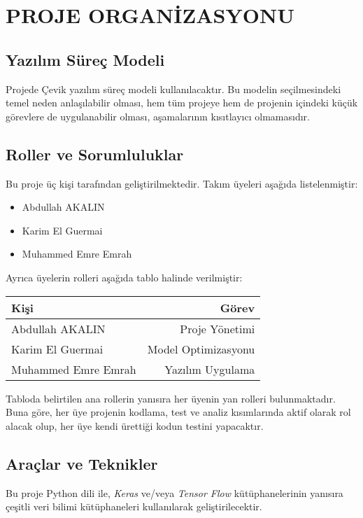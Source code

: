 \documentclass[12pt,a4paper]{article}
\begin{document}
   \section{PROJE ORGANİZASYONU}
   \subsection{Yazılım Süreç Modeli}
   Projede Çevik yazılım süreç modeli kullanılacaktır. Bu modelin seçilmesindeki temel neden anlaşılabilir olması, hem tüm projeye hem de projenin içindeki küçük görevlere de uygulanabilir olması, aşamalarının kısıtlayıcı olmamasıdır. 

   \subsection{Roller ve Sorumluluklar}
   Bu proje üç kişi tarafından geliştirilmektedir. Takım üyeleri aşağıda listelenmiştir:
   \begin{itemize}
      \item Abdullah AKALIN
      \item Karim El Guermai
      \item Muhammed Emre Emrah
   \end{itemize}

   Ayrıca üyelerin rolleri aşağıda tablo halinde verilmiştir:

   \begin{center}
      \begin{tabular}{||l r||}
      \hline
      Kişi & Görev \\[0.5ex]
      \hline\hline
      Abdullah AKALIN & Proje Yönetimi \\
      \hline
      Karim El Guermai & Model Optimizasyonu \\
      \hline
      Muhammed Emre Emrah & Yazılım Uygulama \\
      \hline
      \end{tabular}
   \end{center}

   Tabloda belirtilen ana rollerin yanısıra her üyenin yan rolleri bulunmaktadır. Buna göre, her üye projenin kodlama, test ve analiz kısımlarında aktif olarak rol alacak olup, her üye kendi ürettiği kodun testini yapacaktır. 

   \subsection{Araçlar ve Teknikler}
   Bu proje Python dili ile, \textit{Keras} ve/veya \textit{Tensor Flow} kütüphanelerinin yanısıra çeşitli veri bilimi kütüphaneleri kullanılarak geliştirilecektir.
\end{document}
